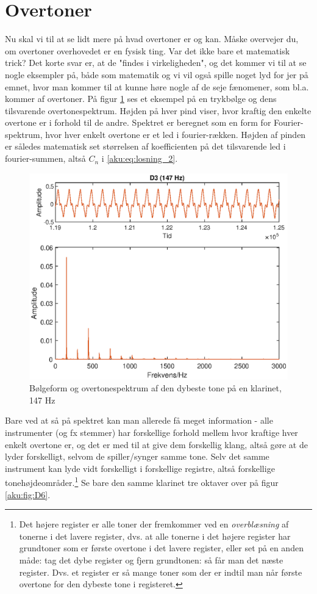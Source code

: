\section{Overtoner}
Nu skal vi til at se lidt mere på hvad overtoner er og kan. Måske overvejer du, om overtoner overhovedet er en fysisk ting. Var det ikke bare et matematisk trick? Det korte svar er, at de "findes i virkeligheden", og det kommer vi til at se nogle eksempler på, både som matematik og vi vil også spille noget lyd for jer på emnet, hvor man kommer til at kunne høre nogle af de seje fænomener, som bl.a. kommer af overtoner. På figur \ref{aku:fig:D3} ses et eksempel på en trykbølge og dens tilsvarende overtonespektrum. Højden på hver pind viser, hvor kraftig den enkelte overtone er i forhold til de andre. Spektret er beregnet som en form for Fourier-spektrum, hvor hver enkelt overtone er et led i fourier-rækken. Højden af pinden er således matematisk set størrelsen af koefficienten på det tilsvarende led i fourier-summen, altså $C_n$ i \eqref{aku:eq:losning_2}.
\begin{figure}[t]
    \centering
    \includegraphics{Akustik/fig/D3.eps}
    \caption{Bølgeform og overtonespektrum af den dybeste tone på en klarinet, 147 \si{.Hz}}
    \label{aku:fig:D3}
\end{figure}
Bare ved at så på spektret kan man allerede få meget information - alle instrumenter (og fx stemmer) har forskellige forhold mellem hvor kraftige hver enkelt overtone er, og det er med til at give dem forskellig klang, altså gøre at de lyder forskelligt, selvom de spiller/synger samme tone. Selv det samme instrument kan lyde vidt forskelligt i forskellige registre, altså forskellige tonehøjdeområder.\footnote{Det højere register er alle toner der fremkommer ved en \textit{overblæsning} af tonerne i det lavere register, dvs. at alle tonerne i det højere register har grundtoner som er første overtone i det lavere register, eller set på en anden måde: tag det dybe register og fjern grundtonen: så får man det næste register. Dvs. et register er så mange toner som der er indtil man når første overtone for den dybeste tone i registeret.} Se bare den samme klarinet tre oktaver over på figur \ref{aku:fig:D6}.
